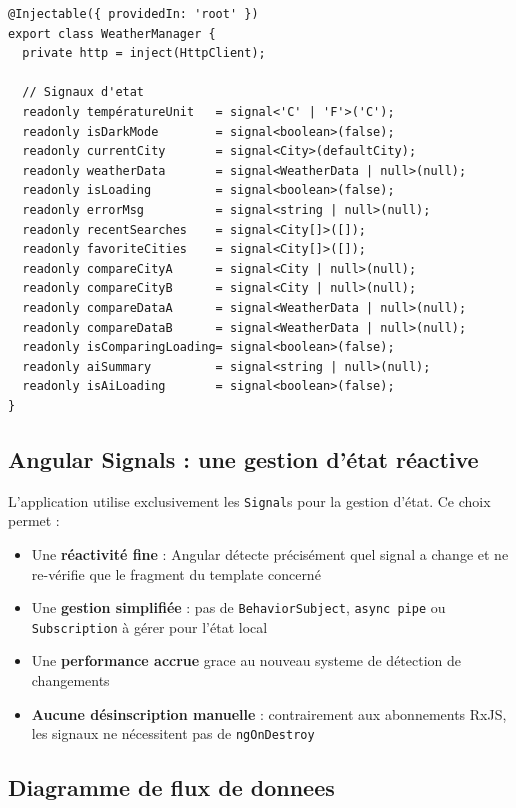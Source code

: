 \documentclass[12pt,a4paper]{article}
\begin{document}
\begin{lstlisting}[style=angular, caption={Declaration et signaux du service}]
@Injectable({ providedIn: 'root' })
export class WeatherManager {
  private http = inject(HttpClient);

  // Signaux d'etat
  readonly températureUnit   = signal<'C' | 'F'>('C');
  readonly isDarkMode        = signal<boolean>(false);
  readonly currentCity       = signal<City>(defaultCity);
  readonly weatherData       = signal<WeatherData | null>(null);
  readonly isLoading         = signal<boolean>(false);
  readonly errorMsg          = signal<string | null>(null);
  readonly recentSearches    = signal<City[]>([]);
  readonly favoriteCities    = signal<City[]>([]);
  readonly compareCityA      = signal<City | null>(null);
  readonly compareCityB      = signal<City | null>(null);
  readonly compareDataA      = signal<WeatherData | null>(null);
  readonly compareDataB      = signal<WeatherData | null>(null);
  readonly isComparingLoading= signal<boolean>(false);
  readonly aiSummary         = signal<string | null>(null);
  readonly isAiLoading       = signal<boolean>(false);
}
\end{lstlisting}

\subsection{Angular Signals : une gestion d'état réactive}

L'application utilise exclusivement les \texttt{Signal}s pour la gestion d'état. Ce choix permet :

\begin{itemize}[nosep]
    \item Une \textbf{réactivité fine} : Angular détecte précisément quel signal a change et ne re-vérifie que le fragment du template concerné
    \item Une \textbf{gestion simplifiée} : pas de \texttt{BehaviorSubject}, \texttt{async pipe} ou \texttt{Subscription} à gérer pour l'état local
    \item Une \textbf{performance accrue} grace au nouveau systeme de détection de changements
    \item \textbf{Aucune désinscription manuelle} : contrairement aux abonnements RxJS, les signaux ne nécessitent pas de \texttt{ngOnDestroy}
\end{itemize}

\subsection{Diagramme de flux de donnees}
\end{document}
